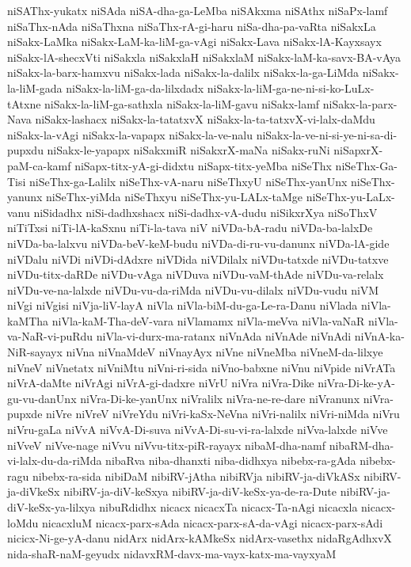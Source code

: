 {niSAThx-yukatx
niSAda
niSA-dha-ga-LeMba
niSAkxma
niSAthx
niSaPx-lamf
niSaThx-nAda
niSaThxna
niSaThx-rA-gi-haru
niSa-dha-pa-vaRta
niSakxLa
niSakx-LaMka
niSakx-LaM-ka-liM-ga-vAgi
niSakx-Lava
niSakx-lA-Kayxsayx
niSakx-lA-shecxVti
niSakxla
niSakxlaH
niSakxlaM
niSakx-laM-ka-savx-BA-vAya
niSakx-la-barx-hamxvu
niSakx-lada
niSakx-la-dalilx
niSakx-la-ga-LiMda
niSakx-la-liM-gada
niSakx-la-liM-ga-da-lilxdadx
niSakx-la-liM-ga-ne-ni-si-ko-LuLx-tAtxne
niSakx-la-liM-ga-sathxla
niSakx-la-liM-gavu
niSakx-lamf
niSakx-la-parx-Nava
niSakx-lashacx
niSakx-la-tatatxvX
niSakx-la-ta-tatxvX-vi-lalx-daMdu
niSakx-la-vAgi
niSakx-la-vapapx
niSakx-la-ve-nalu
niSakx-la-ve-ni-si-ye-ni-sa-di-pupxdu
niSakx-le-yapapx
niSakxmiR
niSakxrX-maNa
niSakx-ruNi
niSapxrX-paM-ca-kamf
niSapx-titx-yA-gi-didxtu
niSapx-titx-yeMba
niSeThx
niSeThx-Ga-Tisi
niSeThx-ga-Lalilx
niSeThx-vA-naru
niSeThxyU
niSeThx-yanUnx
niSeThx-yanunx
niSeThx-yiMda
niSeThxyu
niSeThx-yu-LALx-taMge
niSeThx-yu-LaLx-vanu
niSidadhx
niSi-dadhxshacx
niSi-dadhx-vA-dudu
niSikxrXya
niSoThxV
niTiTxsi
niTi-lA-kaSxnu
niTi-la-tava
niV
niVDa-bA-radu
niVDa-ba-lalxDe
niVDa-ba-lalxvu
niVDa-beV-keM-budu
niVDa-di-ru-vu-danunx
niVDa-lA-gide
niVDalu
niVDi
niVDi-dAdxre
niVDida
niVDilalx
niVDu-tatxde
niVDu-tatxve
niVDu-titx-daRDe
niVDu-vAga
niVDuva
niVDu-vaM-thAde
niVDu-va-relalx
niVDu-ve-na-lalxde
niVDu-vu-da-riMda
niVDu-vu-dilalx
niVDu-vudu
niVM
niVgi
niVgisi
niVja-liV-layA
niVla
niVla-biM-du-ga-Le-ra-Danu
niVlada
niVla-kaMTha
niVla-kaM-Tha-deV-vara
niVlamamx
niVla-meVva
niVla-vaNaR
niVla-va-NaR-vi-puRdu
niVla-vi-durx-ma-ratanx
niVnAda
niVnAde
niVnAdi
niVnA-ka-NiR-sayayx
niVna
niVnaMdeV
niVnayAyx
niVne
niVneMba
niVneM-da-lilxye
niVneV
niVnetatx
niVniMtu
niVni-ri-sida
niVno-babxne
niVnu
niVpide
niVrATa
niVrA-daMte
niVrAgi
niVrA-gi-dadxre
niVrU
niVra
niVra-Dike
niVra-Di-ke-yA-gu-vu-danUnx
niVra-Di-ke-yanUnx
niVralilx
niVra-ne-re-dare
niVranunx
niVra-pupxde
niVre
niVreV
niVreYdu
niVri-kaSx-NeVna
niVri-nalilx
niVri-niMda
niVru
niVru-gaLa
niVvA
niVvA-Di-suva
niVvA-Di-su-vi-ra-lalxde
niVva-lalxde
niVve
niVveV
niVve-nage
niVvu
niVvu-titx-piR-rayayx
nibaM-dha-namf
nibaRM-dha-vi-lalx-du-da-riMda
nibaRva
niba-dhanxti
niba-didhxya
nibebx-ra-gAda
nibebx-ragu
nibebx-ra-sida
nibiDaM
nibiRV-jAtha
nibiRVja
nibiRV-ja-diVkASx
nibiRV-ja-diVkeSx
nibiRV-ja-diV-keSxya
nibiRV-ja-diV-keSx-ya-de-ra-Dute
nibiRV-ja-diV-keSx-ya-lilxya
nibuRdidhx
nicacx
nicacxTa
nicacx-Ta-nAgi
nicacxla
nicacx-loMdu
nicacxluM
nicacx-parx-sAda
nicacx-parx-sA-da-vAgi
nicacx-parx-sAdi
nicicx-Ni-ge-yA-danu
nidArx
nidArx-kAMkeSx
nidArx-vasethx
nidaRgAdhxvX
nida-shaR-naM-geyudx
nidavxRM-davx-ma-vayx-katx-ma-vayxyaM
}
